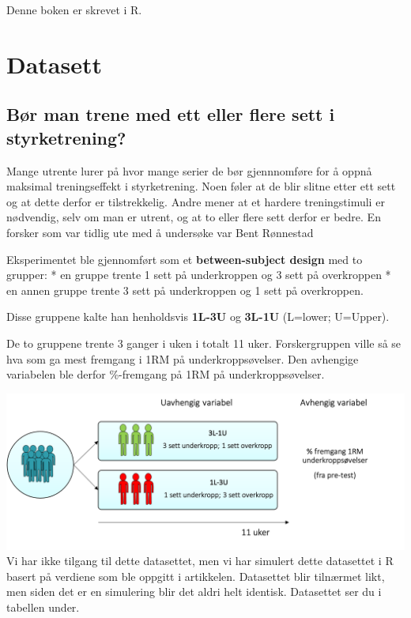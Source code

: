 \documentclass[
]{book}
\begin{document}
Denne boken er skrevet i R.

\hypertarget{datasett}{%
\chapter{Datasett}\label{datasett}}

\hypertarget{buxf8r-man-trene-med-ett-eller-flere-sett-i-styrketrening}{%
\section{Bør man trene med ett eller flere sett i styrketrening?}\label{buxf8r-man-trene-med-ett-eller-flere-sett-i-styrketrening}}

Mange utrente lurer på hvor mange serier de bør gjennnomføre for å oppnå maksimal treningseffekt i styrketrening. Noen føler at de blir slitne etter ett sett og at dette derfor er tilstrekkelig. Andre mener at et hardere treningstimuli er nødvendig, selv om man er utrent, og at to eller flere sett derfor er bedre. En forsker som var tidlig ute med å undersøke var Bent Rønnestad \citep{ronnestad_dissimilar_2007}

Eksperimentet ble gjennomført som et \textbf{between-subject design} med to grupper:
* en gruppe trente 1 sett på underkroppen og 3 sett på overkroppen
* en annen gruppe trente 3 sett på underkroppen og 1 sett på overkroppen.

Disse gruppene kalte han henholdsvis \textbf{1L-3U} og \textbf{3L-1U} (L=lower; U=Upper).

De to gruppene trente 3 ganger i uken i totalt 11 uker. Forskergruppen ville så se hva som ga mest fremgang i 1RM på underkroppsøvelser. Den avhengige variabelen ble derfor \%-fremgang på 1RM på underkroppsøvelser.

\includegraphics{design.png}
Vi har ikke tilgang til dette datasettet, men vi har simulert dette datasettet i R basert på verdiene som ble oppgitt i artikkelen. Datasettet blir tilnærmet likt, men siden det er en simulering blir det aldri helt identisk. Datasettet ser du i tabellen under.
\end{document}
